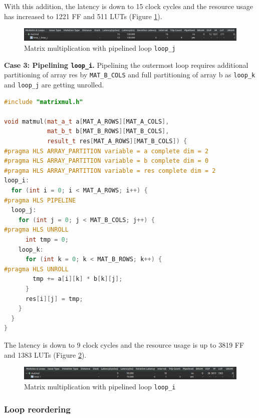 \documentclass[a4paper, twoside]{report}
\theoremstyle{definition}
\numberwithin{equation}{section}
\begin{document}
With this addition, the latency is down to 15 clock cycles and the resource usage
has increased to 1221 FF and 511 LUTs (Figure \ref{fig:matmul_pipej_synth}).

\begin{figure}[h!]
    \centering
    \includegraphics[width=\textwidth]{matmul_pipej_synth.png}
    \caption{Matrix multiplication with pipelined loop \texttt{loop\_j}}
    \label{fig:matmul_pipej_synth}
\end{figure}

\textbf{Case 3: Pipelining \texttt{loop\_i}.} Pipelining the outermost loop requires
additional partitioning of array res by \texttt{MAT\_B\_COLS} and full partitioning
of array b as \texttt{loop\_k} and \texttt{loop\_j} are getting unrolled.

\begin{lstlisting}[language=c++,numbers=none]
#include "matrixmul.h"

void matmul(mat_a_t a[MAT_A_ROWS][MAT_A_COLS],
            mat_b_t b[MAT_B_ROWS][MAT_B_COLS],
            result_t res[MAT_A_ROWS][MAT_B_COLS]) {
#pragma HLS ARRAY_PARTITION variable = a complete dim = 2
#pragma HLS ARRAY_PARTITION variable = b complete dim = 0
#pragma HLS ARRAY_PARTITION variable = res complete dim = 2
loop_i:
  for (int i = 0; i < MAT_A_ROWS; i++) {
#pragma HLS PIPELINE
  loop_j:
    for (int j = 0; j < MAT_B_COLS; j++) {
#pragma HLS UNROLL
      int tmp = 0;
    loop_k:
      for (int k = 0; k < MAT_B_ROWS; k++) {
#pragma HLS UNROLL
        tmp += a[i][k] * b[k][j];
      }
      res[i][j] = tmp;
    }
  }
}
\end{lstlisting}

The latency is down to 9 clock cycles and the resource usage is up to 3819 FF and 1383 LUTs
(Figure \ref{fig:matmul_pipei_synth}).

\begin{figure}[h!]
    \centering
    \includegraphics[width=\textwidth]{matmul_pipei_synth.png}
    \caption{Matrix multiplication with pipelined loop \texttt{loop\_i}}
    \label{fig:matmul_pipei_synth}
\end{figure}

\subsubsection{Loop reordering} \label{sec:mm_loop_reordering}
\end{document}
